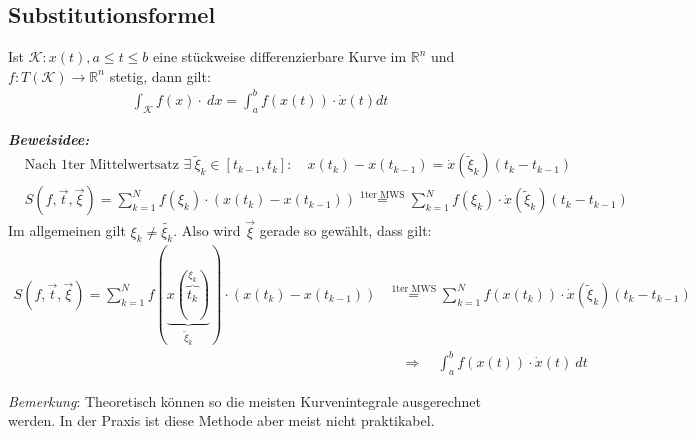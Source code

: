 \documentclass[11pt,a4paper]{book}
\newcommand {\Rn}	{\mathbb{R}^n}
\newcommand{\1}    	{\mathbbm{1}}
\newcommand{\Kurve}	{{\mathcal{K}}}
\newcommand{\Beweis}[1][Beweis]
{\begin{mdframed}[backgroundcolor=gray!10,linewidth=0pt]\noindent\textit{\textbf{{#1}:}}~}
\newcommand{\QED}	{\end{mdframed}}
\newcommand{\Bemerkung}	{\noindent\textit{Bemerkung}: }
\begin{document}
\subsection{Substitutionsformel}
\label{sec:subst_formel}
Ist \(\Kurve : x(t), a \leqslant t \leqslant b\) eine stückweise differenzierbare Kurve im \(\Rn\) und \(f : T(\Kurve) \rightarrow \Rn\) stetig, dann gilt:
\begin{align*}
	\int_\Kurve f(x) \cdot ~dx = \int_a^b f(x(t)) \cdot \dot{x}(t) dt
\end{align*}
\Beweis[Beweisidee]
	\begin{align*}
		&\textrm{Nach 1ter Mittelwertsatz } \exists~\tilde{\xi}_k \in [t_{k-1},t_k]: \quad
		x(t_k) - x(t_{k-1}) = \dot{x}(\tilde{\xi}_k) (t_k - t_{k-1}) \\
		&S\left( f, \vec{t}, \vec{\xi} \right) = 
		\sum_{k=1}^N f(\xi_k) \cdot \left(x(t_k) - x(t_{k-1})\right) \stackrel{\textrm{1ter MWS}}{=} 
		\sum_{k=1}^N f(\xi_k) \cdot \dot{x}(\tilde{\xi}_k) (t_k - t_{k-1})
	\end{align*}
	Im allgemeinen gilt \(\xi_k \neq \tilde{\xi_k}\). Also wird \(\vec{\xi}\) gerade so gewählt, dass gilt:
	\begin{align*}
		S\left( f, \vec{t}, \vec{\xi} \right) = 
		\sum_{k=1}^N f\left( \underbrace{x \left(\overbrace{t_k}^{\xi_k}\right)}_{\tilde{\xi}_k}\right) \cdot \left(x(t_k) - x(t_{k-1})\right) &\stackrel{\textrm{1ter MWS}}{=} 
		\sum_{k=1}^N f(x(t_k)) \cdot \dot{x}(\tilde{\xi}_k) (t_k - t_{k-1}) \\
		&\quad \Rightarrow \quad \int_a^b f(x(t)) \cdot \dot{x}(t) ~dt
	\end{align*}
\QED
\Bemerkung Theoretisch können so die meisten Kurvenintegrale ausgerechnet werden. In der Praxis ist diese Methode aber meist nicht praktikabel.
\end{document}
